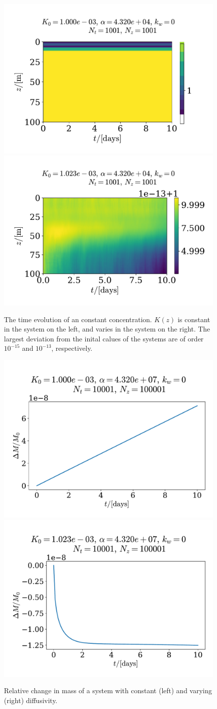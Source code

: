 \documentclass{article}
\begin{document}
    \begin{figure}
        \centering
        \includegraphics[width=.49\textwidth]{../plots/test1}
        \includegraphics[width=.49\textwidth]{../plots/test1_varK}
        \caption{The time evolution of an constant concentration. $K(z)$ is constant in the system on the left, and varies in the system on the right. The largest deviation from the inital calues of the systems are of order $10^{-15}$ and $10^{-13}$, respectively.}
        \label{constant_cons}
    \end{figure}

    \begin{figure}
        \centering
        \includegraphics[width=.49\textwidth]{../plots/test2_m}
        \includegraphics[width=.49\textwidth]{../plots/test2_varK_m}
        \caption{Relative change in mass of a system with constant (left) and varying (right) diffusivity.}
        \label{Consv mass}
    \end{figure}
\end{document}
